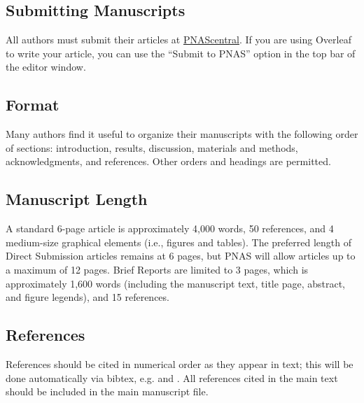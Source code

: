 \documentclass[9pt,twocolumn,twoside]{pnas-new}
\begin{document}
\subsection*{Submitting Manuscripts}

All authors must submit their articles at \href{http://www.pnascentral.org/cgi-bin/main.plex}{PNAScentral}. If you are using Overleaf to write your article, you can use the ``Submit to PNAS'' option in the top bar of the editor window.

\subsection*{Format}

Many authors find it useful to organize their manuscripts with the following order of sections: introduction, results, discussion, materials and methods, acknowledgments, and references. Other orders and headings are permitted.

\subsection*{Manuscript Length}

A standard 6-page article is approximately 4,000 words, 50 references, and 4 medium-size graphical elements (i.e., figures and tables). The preferred length of Direct Submission articles remains at 6 pages, but PNAS will allow articles up to a maximum of 12 pages. Brief Reports are limited to 3 pages, which is approximately 1,600 words (including the manuscript text, title page, abstract, and figure legends), and 15 references.

\subsection*{References}

References should be cited in numerical order as they appear in text; this will be done automatically via bibtex, e.g. \cite{belkin2002using} and \cite{berard1994embedding,coifman2005geometric,phdthesis,masterthesis}. All references cited in the main text should be included in the main manuscript file.\Endparasplit

%
\end{document}
